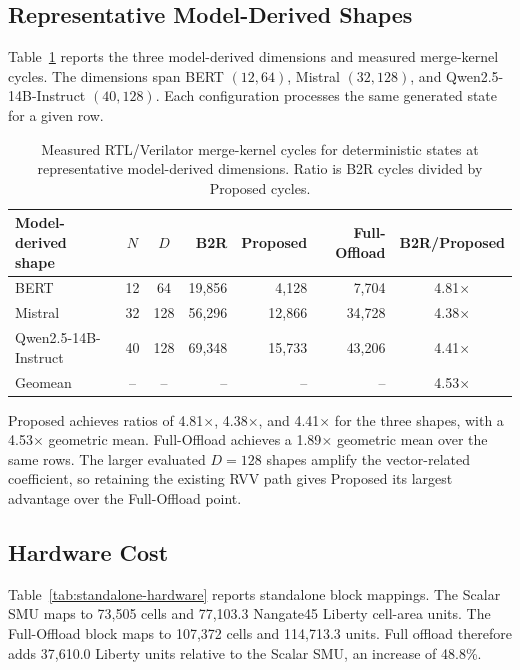 \documentclass[journal]{IEEEtran}
\newcommand{\btor}{\mbox{B2R}}
\begin{document}
\subsection{Representative Model-Derived Shapes}

Table~\ref{tab:model-cycles} reports the three model-derived dimensions and
measured merge-kernel cycles. The dimensions span BERT $(12,64)$, Mistral
$(32,128)$, and Qwen2.5-14B-Instruct $(40,128)$. Each configuration processes
the same generated state for a given row.

\begin{table}[t]
\centering
\caption{Measured RTL/Verilator merge-kernel cycles for deterministic states
at representative model-derived dimensions. Ratio is \btor{} cycles divided
by Proposed cycles.}
\label{tab:model-cycles}
\renewcommand{\arraystretch}{1.08}
\begin{tabular}{l c c r r r c}
\toprule
Model-derived shape & $N$ & $D$ & \btor{} & Proposed & Full-Offload & \btor{}/Proposed\\
\midrule
BERT & 12 & 64 & 19,856 & 4,128 & 7,704 & 4.81$\times$\\
Mistral & 32 & 128 & 56,296 & 12,866 & 34,728 & 4.38$\times$\\
Qwen2.5-14B-Instruct & 40 & 128 & 69,348 & 15,733 & 43,206 & 4.41$\times$\\
Geomean & -- & -- & -- & -- & -- & 4.53$\times$\\
\bottomrule
\end{tabular}
\end{table}

Proposed achieves ratios of 4.81$\times$, 4.38$\times$, and 4.41$\times$ for
the three shapes, with a 4.53$\times$ geometric mean. Full-Offload achieves a
1.89$\times$ geometric mean over the same rows. The larger evaluated $D=128$
shapes amplify the vector-related coefficient, so retaining the existing RVV
path gives Proposed its largest advantage over the Full-Offload point.

\subsection{Hardware Cost}

Table~\ref{tab:standalone-hardware} reports standalone block mappings. The
Scalar SMU maps to 73,505 cells and 77,103.3 Nangate45 Liberty cell-area
units. The Full-Offload block maps to 107,372 cells and 114,713.3 units. Full
offload therefore adds 37,610.0 Liberty units relative to the Scalar SMU, an
increase of 48.8\%.
\end{document}
